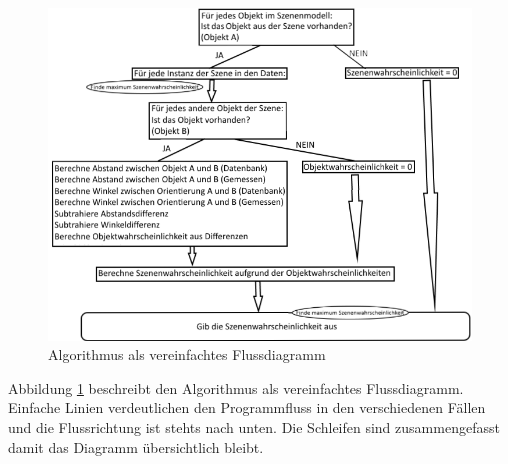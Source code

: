 \begin{figure}
	\centering
	\includegraphics[width=14cm]{bilder/AlgorithmusRoh.pdf}
	\caption{Algorithmus als vereinfachtes Flussdiagramm}
	\label{img:janein}
\end{figure}
Abbildung \ref{img:janein} beschreibt den Algorithmus als vereinfachtes Flussdiagramm. Einfache Linien verdeutlichen den Programmfluss in den verschiedenen Fällen und die Flussrichtung ist stehts nach unten. Die Schleifen sind zusammengefasst damit das Diagramm übersichtlich bleibt.

